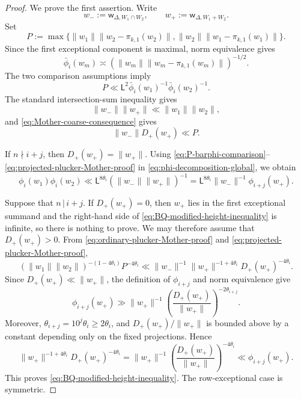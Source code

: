 \documentclass[reqno,11pt]{amsart}
\numberwithin{equation}{section}
\theoremstyle{definition}
\theoremstyle{remark}
\begin{document}
\begin{proof}
We prove the first assertion. Write
$$
w_-:=\mathsf w_{\Delta,W_1\cap W_2},
\qquad
w_+:=\mathsf w_{\Delta,W_1+W_2}.
$$
Set
$$P:=\max\{\|w_1\|\|w_2-\pi_{k,1}(w_2)\|,\|w_2\|\|w_1-\pi_{k,1}(w_1)\|\}.$$
Since the first exceptional component is maximal, norm equivalence gives
$$
\bar\phi_i(w_m)\asymp(\|w_m\|\|w_m-\pi_{k,1}(w_m)\|)^{-1/2}.
$$
The two comparison assumptions imply
\begin{equation}\label{eq:P-barphi-comparison}
P\ll \mathsf L^2
\bar\phi_i(w_1)^{-1}\bar\phi_i(w_2)^{-1}.
\end{equation}
The standard intersection-sum inequality \cite[Lemma~5.6]{eskin-margulis-mozes:1998} gives
\begin{equation}\label{eq:ordinary-plucker-Mother-proof}
\|w_{-}\|\|w_+\|\ll \|w_1\|\|w_2\|,
\end{equation}
and \eqref{eq:Mother-coarse-consequence} gives
\begin{equation}\label{eq:projected-plucker-Mother-proof}
\|w_{-}\|D_+(w_+)\ll P.
\end{equation}

If $n\nmid i+j$, then $D_+(w_+)=\|w_{+}\|$. Using
\eqref{eq:P-barphi-comparison}--\eqref{eq:projected-plucker-Mother-proof}
in \eqref{eq:phi-decomposition-global}, we obtain
$$
\phi_i(w_1)\phi_i(w_2)
\ll \mathsf L^{8\theta_i}(\|w_{-}\|\|w_{+}\|)^{-1}
=\mathsf L^{8\theta_i}\|w_{-}\|^{-1}\phi_{i+j}(w_+).
$$

Suppose that $n\,|\,i+j$. If $D_+(w_+)=0$, then $w_+$ lies in the first exceptional
summand and the right-hand side of
\eqref{eq:BQ-modified-height-inequality} is infinite, so there is nothing
to prove. We may therefore assume that $D_+(w_+)>0$. From \eqref{eq:ordinary-plucker-Mother-proof} and
\eqref{eq:projected-plucker-Mother-proof},
$$
(\|w_1\|\|w_2\|)^{-(1-4\theta_i)}P^{-4\theta_i}
\ll
\|w_{-}\|^{-1}\|w_{+}\|^{-1+4\theta_i}D_+(w_+)^{-4\theta_i}.
$$
Since $D_+(w_+)\ll \|w_{+}\|$, the definition of $\phi_{i+j}$ and norm
equivalence give
$$
\phi_{i+j}(w_+)
\gg \|w_{+}\|^{-1}
\left(\frac{D_+(w_+)}{\|w_{+}\|}\right)^{-2\theta_{i+j}}.
$$
Moreover, $\theta_{i+j}=10^j\theta_i\ge2\theta_i$, and
$D_+(w_+)/\|w_{+}\|$ is bounded above by a constant depending only on the fixed
projections. Hence
$$
\|w_{+}\|^{-1+4\theta_i}D_+(w_+)^{-4\theta_i}
=\|w_{+}\|^{-1}\left(\frac{D_+(w_+)}{\|w_{+}\|}\right)^{-4\theta_i}
\ll \phi_{i+j}(w_+).
$$
This proves \eqref{eq:BQ-modified-height-inequality}. The row-exceptional
case is symmetric.
\end{proof}
\end{document}
